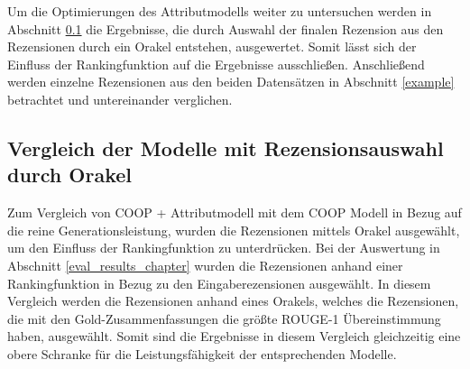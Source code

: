 Um die Optimierungen des Attributmodells weiter zu untersuchen werden in Abschnitt \ref{oracle} die Ergebnisse, die durch Auswahl der finalen Rezension aus den Rezensionen durch ein Orakel entstehen, ausgewertet.
Somit lässt sich der Einfluss der Rankingfunktion auf die Ergebnisse ausschließen.
Anschließend werden einzelne Rezensionen aus den beiden Datensätzen in Abschnitt \ref{example} betrachtet und untereinander verglichen.



\subsection{Vergleich der Modelle mit Rezensionsauswahl durch Orakel}
\label{oracle}
Zum Vergleich von COOP + Attributmodell mit dem COOP Modell in Bezug auf die reine Generationsleistung, wurden die Rezensionen mittels Orakel ausgewählt, um den Einfluss der Rankingfunktion zu unterdrücken.
Bei der Auswertung in Abschnitt \ref{eval_results_chapter} wurden die Rezensionen anhand einer Rankingfunktion in Bezug zu den Eingaberezensionen ausgewählt.
In diesem Vergleich werden die Rezensionen anhand eines Orakels, welches die Rezensionen, die mit den Gold-Zusammenfassungen die größte ROUGE-1 Übereinstimmung haben, ausgewählt.
Somit sind die Ergebnisse in diesem Vergleich gleichzeitig eine obere Schranke für die Leistungsfähigkeit der entsprechenden Modelle.


